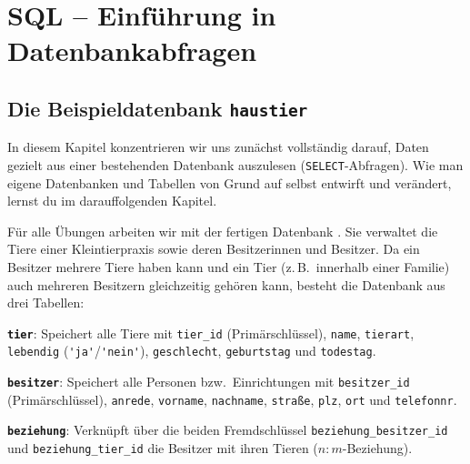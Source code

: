 \chapter{SQL -- Einführung in Datenbankabfragen}
\renewcommand{\chaptertitle}{SQL -- Einführung in Datenbankabfragen}

\lehead[]{\normalfont\sffamily\hspace*{-2.00cm}\textcolor{white}{\colorbox{lightblue}{\makebox[1.60cm][r]{\thechapter}}}\hspace{0.17cm}\textcolor{lightblue}{\chaptertitle}}
\rohead[]{\textcolor{lightblue}{\chaptertitle}\normalfont\sffamily\hspace*{0.17cm}\textcolor{white}{\colorbox{lightblue}{\makebox[1.60cm][l]{\thechapter}}}\hspace{-2.00cm}}
\rehead[]{\textcolor{lightblue}{AvHG, Inf, My}}
\lohead[]{\textcolor{lightblue}{AvHG, Inf, My}}

\lstset{style=mySQL}

\section{Die Beispieldatenbank \texttt{haustier}}

In diesem Kapitel konzentrieren wir uns zunächst vollständig darauf, Daten
gezielt aus einer bestehenden Datenbank auszulesen (\lstinline|SELECT|-Abfragen).
Wie man eigene Datenbanken und Tabellen von Grund auf selbst entwirft und
verändert, lernst du im darauffolgenden Kapitel.

Für alle Übungen arbeiten wir mit der fertigen Datenbank . Sie
verwaltet die Tiere einer Kleintierpraxis sowie deren Besitzerinnen und
Besitzer. Da ein Besitzer mehrere Tiere haben kann und ein Tier (z.\,B.\ innerhalb
einer Familie) auch mehreren Besitzern gleichzeitig gehören kann, besteht die
Datenbank aus drei Tabellen:

\begin{compactitem}
  \item \textbf{\texttt{tier}}: Speichert alle Tiere mit \lstinline|tier_id|
  (Primärschlüssel), \lstinline|name|, \lstinline|tierart|, \lstinline|lebendig|
  (\lstinline|'ja'|/\lstinline|'nein'|), \lstinline|geschlecht|,
  \lstinline|geburtstag| und \lstinline|todestag|.
  \item \textbf{\texttt{besitzer}}: Speichert alle Personen bzw.\ Einrichtungen
  mit \lstinline|besitzer_id| (Primärschlüssel), \lstinline|anrede|,
  \lstinline|vorname|, \lstinline|nachname|, \lstinline|straße|, \lstinline|plz|,
  \lstinline|ort| und \lstinline|telefonnr|.
  \item \textbf{\texttt{beziehung}}: Verknüpft über die beiden Fremdschlüssel
  \lstinline|beziehung_besitzer_id| und \lstinline|beziehung_tier_id| die
  Besitzer mit ihren Tieren ($n:m$-Beziehung).
\end{compactitem}

